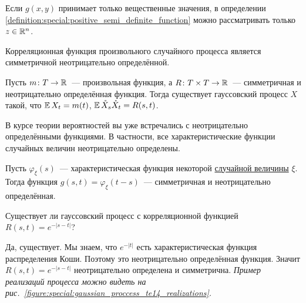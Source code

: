 \begin{remark}
    \label{remark:special:positive_semi_definite_function_for_reals}
    Если $ g(x, y) $ принимает только вещественные значения,
    в определении \ref{definition:special:positive_semi_definite_function} можно рассматривать только $ z \in \mathbb{R}^n $.
\end{remark}

\begin{statement}
    \label{statement:special:correlation_function_is_semi_definite}
    Корреляционная функция произвольного случайного процесса является симметричной неотрицательно определённой.
\end{statement}

\begin{statement}
    \label{statement:special:mean_and_cov_define_gaussian_process}
    Пусть $ m \colon T \to \mathbb{R} $~--- произвольная функция,
    а $ R \colon T \times T \to \mathbb{R} $~--- симметричная и неотрицательно определённая функция.
    Тогда существует гауссовский процесс $ X $ такой, что $ \operatorname{\mathbb{E}} X_t = m(t) $, $ \operatorname{\mathbb{E}} \mathring{X}_s \mathring{X}_t = R(s, t) $.
\end{statement}

В курсе теории вероятностей вы уже встречались с неотрицательно определёнными функциями.
В частности, все характеристические функции случайных величин неотрицательно определены.

\begin{statement}
    \label{statement:special:characteristic_function_is_positive_semi_definite}
    Пусть $ \varphi_\xi(s) $~--- характеристическая функция некоторой \uline{случайной величины} $ \xi $.
    Тогда функция $ g(s, t) = \varphi_\xi(t - s) $~--- симметричная и неотрицательно определённая.
\end{statement}

\begin{exercise}
    \label{exercise:special:gaussian_from_characteristic_function_of_Cauchy}
    Существует ли гауссовский процесс с корреляционной функцией $ R(s, t) = e^{-|s - t|} $?
\end{exercise}

\begin{solution}
    Да, существует.
    Мы знаем, что $e^{-|t|} $ есть характеристическая функция распределения Коши.
    Поэтому это неотрицательно определённая функция.
    Значит $ R(s, t) = e^{-|s - t|} $ неотрицательно определена и симметрична.
    \newline
    \textit{Пример реализаций процесса
    можно видеть на рис.~\ref{figure:special:gaussian_proccess_te14_realizations}.}
\end{solution}


